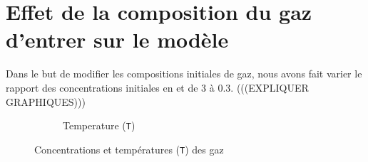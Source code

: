 \documentclass[11pt]{report}
\begin{document}
        \section{Effet de la composition du gaz d'entrer sur le modèle}
            Dans le but de modifier les compositions initiales de gaz,
            nous avons fait varier le rapport des concentrations initiales en  et  de 3 à 0.3.
            (((EXPLIQUER GRAPHIQUES)))
            \begin{figure}[ht]
                \centering
                \begin{subfigure}[t]{0.325\textwidth}
                    \centering
                    
                    \caption{}
                    \label{graph:con:C0:CH4}
                \end{subfigure}
                \hfill
                \begin{subfigure}[t]{0.325\textwidth}
                    \centering
                    
                    \caption{}
                    \label{graph:con:C0:H2}
                \end{subfigure}
                \hfill
                \begin{subfigure}[t]{0.325\textwidth}
                    \centering
                    
                    \caption{}
                    \label{graph:con:C0:CO}
                \end{subfigure}
                \hfill
                \begin{subfigure}[t]{0.325\textwidth}
                    \centering
                    
                    \caption{}
                    \label{graph:con:C0:CO2}
                \end{subfigure}
                \begin{subfigure}[t]{0.325\textwidth}
                    \centering
                    
                    \caption{Temperature (\texttt{T})}
                    \label{graph:con:C0:T}
                \end{subfigure}
                \caption{Concentrations et températures (\texttt{T}) des gaz}
                \label{graph:con:C0}
            \end{figure}
\end{document}
